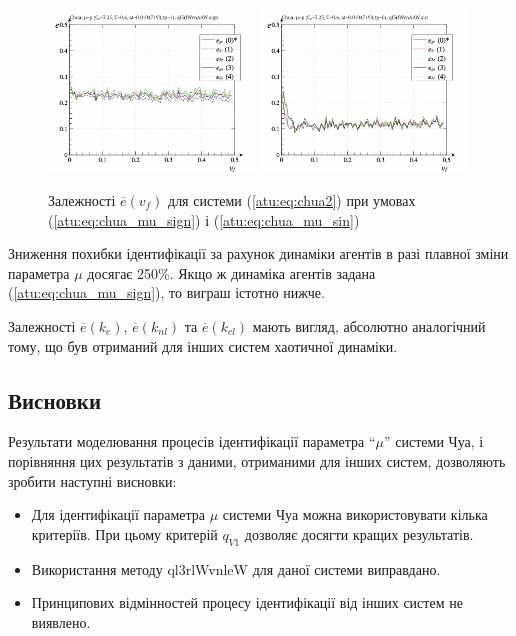 \begin{figure}[htb!]
  \centerline{
    \includegraphics[width=0.49\textwidth]{p/cha/chua/ql3rlWvnAAW/chua_id-p_v_f_sign.png}
    \hfill
    \includegraphics[width=0.49\textwidth]{p/cha/chua/ql3rlWvnAAW/chua_id-p_v_f_sin.png}
  }
\caption{Залежності $ \overline{e} (v_f) $ для системи (\ref{atu:eq:chua2}) при умовах (\ref{atu:eq:chua_mu_sign}) і (\ref{atu:eq:chua_mu_sin})}
\label{atu:f:chua_e_v_f}
\end{figure}

Зниження похибки ідентифікації за рахунок динаміки агентів в
разі плавної зміни параметра
$ \mu $ досягає 250\%. Якщо ж динаміка агентів задана (\ref{atu:eq:chua_mu_sign}),
то виграш істотно нижче.

Залежності
$\overline{e}(k_e)$,
$\overline{e}(k_{nl})$ та
$\overline{e}(k_{cl})$
мають вигляд, абсолютно аналогічний тому, що був отриманий для
інших систем хаотичної динаміки.





\subsection{Висновки} %

Результати моделювання процесів ідентифікації параметра ``$\mu$''
системи Чуа, і порівняння цих результатів з даними, отриманими
для інших систем, дозволяють зробити наступні висновки:

\begin{itemize}

  \item
    Для ідентифікації параметра
    $ \mu $ системи Чуа можна використовувати кілька критеріїв. При
    цьому критерій
    $ q_{V1} $ дозволяє досягти кращих результатів.

  \item
    Використання методу ql3rlWvnleW для даної системи виправдано.

  \item
    Принципових відмінностей процесу ідентифікації від інших
    систем не виявлено.

\end{itemize}





